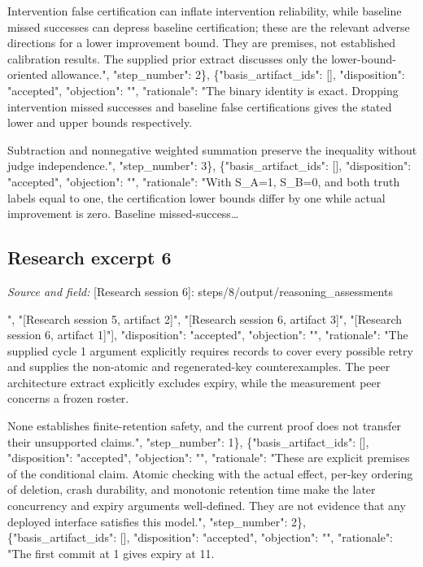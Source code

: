 \documentclass[11pt]{article}
\begin{document}
Intervention false certification can inflate intervention reliability, while baseline missed successes can depress baseline certification; these are the relevant adverse directions for a lower improvement bound. They are premises, not established calibration results. The supplied prior extract discusses only the lower-bound-oriented allowance.", "step\_number": 2\}, \{"basis\_artifact\_ids": [], "disposition": "accepted", "objection": "", "rationale": "The binary identity is exact. Dropping intervention missed successes and baseline false certifications gives the stated lower and upper bounds respectively.

Subtraction and nonnegative weighted summation preserve the inequality without judge independence.", "step\_number": 3\}, \{"basis\_artifact\_ids": [], "disposition": "accepted", "objection": "", "rationale": "With S\_A=1, S\_B=0, and both truth labels equal to one, the certification lower bounds differ by one while actual improvement is zero. Baseline missed-success\ldots{}

\subsection{Research excerpt 6}
\textit{Source and field: }[Research session 6]: steps/8/output/reasoning\_assessments\par
[\{"basis\_artifact\_ids": ["[Research session 6, artifact 2]", "[Research session 5, artifact 2]", "[Research session 6, artifact 3]", "[Research session 6, artifact 1]"], "disposition": "accepted", "objection": "", "rationale": "The supplied cycle 1 argument explicitly requires records to cover every possible retry and supplies the non-atomic and regenerated-key counterexamples. The peer architecture extract explicitly excludes expiry, while the measurement peer concerns a frozen roster.

None establishes finite-retention safety, and the current proof does not transfer their unsupported claims.", "step\_number": 1\}, \{"basis\_artifact\_ids": [], "disposition": "accepted", "objection": "", "rationale": "These are explicit premises of the conditional claim. Atomic checking with the actual effect, per-key ordering of deletion, crash durability, and monotonic retention time make the later concurrency and expiry arguments well-defined. They are not evidence that any deployed interface satisfies this model.", "step\_number": 2\}, \{"basis\_artifact\_ids": [], "disposition": "accepted", "objection": "", "rationale": "The first commit at 1 gives expiry at 11.
\end{document}
